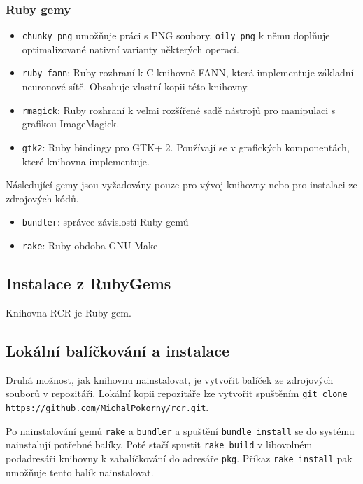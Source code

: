\documentclass[a4paper]{article}
\def\githuburl{https://github.com/MichalPokorny/rcr.git}
\begin{document}
\subsubsection{Ruby gemy}
\begin{itemize}
\item \texttt{chunky\_png} umožňuje práci s PNG soubory.
	\texttt{oily\_png} k němu doplňuje optimalizované nativní varianty
	některých operací.
\item \texttt{ruby-fann}: Ruby rozhraní k C knihovně FANN, která implementuje
	základní neuronové sítě. Obsahuje vlastní kopii této knihovny.
\item \texttt{rmagick}: Ruby rozhraní k velmi rozšířené sadě nástrojů pro
	manipulaci s grafikou ImageMagick.
\item \texttt{gtk2}: Ruby bindingy pro GTK+ 2. Používají se v grafických
	komponentách, které knihovna implementuje.
\end{itemize}

Následující gemy jsou vyžadovány pouze pro vývoj knihovny nebo pro instalaci
ze zdrojových kódů.
\begin{itemize}
\item \texttt{bundler}: správce závislostí Ruby gemů
\item \texttt{rake}: Ruby obdoba GNU Make
\end{itemize}

\subsection{Instalace z RubyGems}
Knihovna RCR je Ruby gem.

\subsection{Lokální balíčkování a instalace}
Druhá možnost, jak knihovnu nainstalovat, je vytvořit balíček ze zdrojových
souborů v repozitáři. Lokální kopii repozitáře lze vytvořit spuštěním
\texttt{git clone \githuburl}.

Po nainstalování gemů \texttt{rake} a \texttt{bundler} a spuštění
\texttt{bundle install} se do systému nainstalují potřebné balíky. Poté
stačí spustit \texttt{rake build} v libovolném podadresáři knihovny
k zabalíčkování do adresáře \texttt{pkg}. Příkaz \texttt{rake install} pak
umožňuje tento balík nainstalovat.
\end{document}
